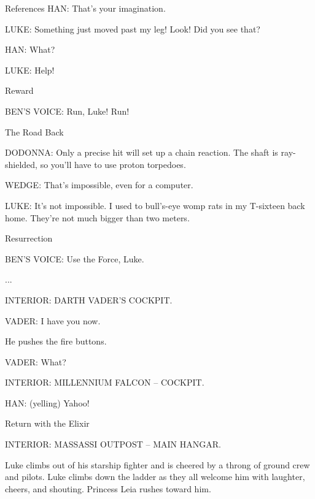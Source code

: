 \documentclass[a4paper,azure,pdf,colorBG,slideColor]{prosper}
\newcommand{\ns}[1]{\vfill \end{slide}\begin{slide}{#1}}
\newcommand{\bs}{\bigskip}
\begin{document}
\begin{slide}{References}
HAN: That's your imagination.

\bs

LUKE: Something just moved past my leg! Look! Did you see that?

\bs

HAN: What?

\bs

LUKE: Help!



\ns{Reward}

\bs

BEN'S VOICE: Run, Luke! Run!



\ns{The Road Back}


DODONNA: Only a precise hit will set up a chain reaction. The shaft is
ray-shielded, so you'll have to use proton torpedoes.

\bs

WEDGE: That's impossible, even for a computer.

\bs

LUKE: It's not impossible. I used to bull's-eye womp rats in my
T-sixteen back home. They're not much bigger than two meters.

\ns{Resurrection}


BEN'S VOICE: Use the Force, Luke.

...
\bs

INTERIOR: DARTH VADER'S COCKPIT.

\bs

VADER: I have you now.

\bs

           He pushes the fire buttons.

\bs

VADER: What?

\bs


INTERIOR: MILLENNIUM FALCON -- COCKPIT.

\bs

HAN: (yelling) Yahoo!



\ns{Return with the Elixir}


INTERIOR: MASSASSI OUTPOST -- MAIN HANGAR.

\bs

Luke climbs out of his starship fighter and is cheered by a
throng of ground crew and pilots. Luke climbs down the ladder
as they all welcome him with laughter, cheers, and shouting.
Princess Leia rushes toward him.

\bs


\end{slide}
\end{document}
